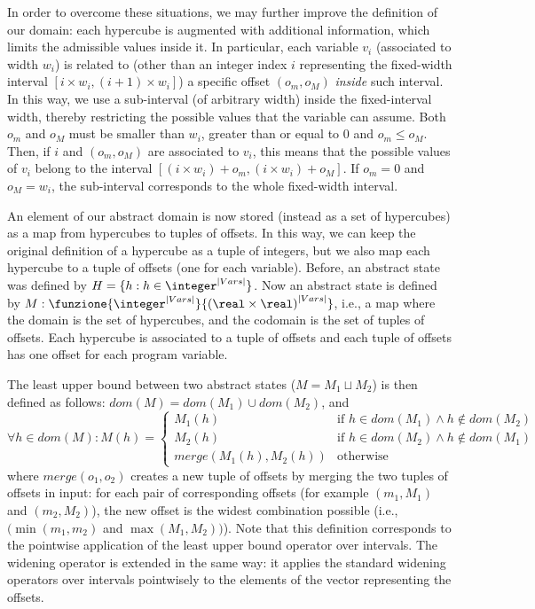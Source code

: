 In order to overcome these situations, we may further improve the definition of our domain: each hypercube is augmented with additional information, which limits the admissible values inside it. In particular, each variable $v_i$ (associated to width $w_i$) is related to (other than an integer index $i$ representing the fixed-width interval $[i \times w_i, (i+1) \times w_i]$) a specific offset $(o_m,o_M)$ \emph{inside} such interval. In this way, we use a sub-interval (of arbitrary width) inside the fixed-interval width, thereby restricting the possible values that the variable can assume. Both $o_m$ and $o_M$ must be smaller than $w_i$, greater than or equal to $0$ and $o_m \leq o_M$. Then, if $i$ and $(o_m,o_M)$ are associated to $v_i$, this means that the possible values of $v_i$ belong to the interval $[(i \times w_i) + o_m, (i \times w_i) + o_M]$. If $o_m=0$ and $o_M=w_i$, the sub-interval corresponds to the whole fixed-width interval. 

An element of our abstract domain is now stored (instead as a set of hypercubes) as a map from hypercubes to tuples of offsets. In this way, we can keep the original definition of a hypercube as a tuple of integers, but we also map each hypercube to a tuple of offsets (one for each variable). Before, an abstract state was defined by $ H = \{ h : h \in \integer^{|Vars|}\} $. Now an abstract state is defined by $M : \funzione{\integer^{|Vars|}}{{(\real \times \real)}^{|Vars|}}$, i.e., a map where the domain is the set of hypercubes, and the codomain is the set of tuples of offsets. Each hypercube is associated to a tuple of offsets and each tuple of offsets has one offset for each program variable.

The least upper bound between two abstract states ($M=M_1 \sqcup M_2$) is then defined as follows: $dom(M) = dom(M_1) \cup dom(M_2)$, and 
$$
\forall h \in dom(M) : M(h) = \begin{cases}
M_1(h) & \mbox{if } h \in dom(M_1) \wedge h \notin dom(M_2) \\
M_2(h) & \mbox{if } h \in dom(M_2) \wedge h \notin dom(M_1) \\
merge(M_1(h),M_2(h)) & \mbox{otherwise }
\end{cases}$$
where $merge(o_1,o_2)$ creates a new tuple of offsets by merging the two tuples of offsets in input: for each pair of corresponding offsets (for example $(m_1,M_1)$ and $(m_2,M_2)$), the new offset is the widest combination possible (i.e., $(\min(m_1,m_2)$ and $\max(M_1,M_2))$). Note that this definition corresponds to the pointwise application of the least upper bound operator over intervals. The widening operator is extended in the same way: it applies the standard widening operators over intervals pointwisely to the elements of the vector representing the offsets.

